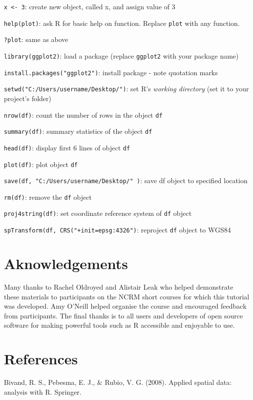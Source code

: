 \documentclass[]{article}
\begin{document}
\texttt{x \textless{}- 3}: create new object, called x, and assign value
of 3

\texttt{help(plot)}: ask R for basic help on function. Replace
\texttt{plot} with any function.

\texttt{?plot}: same as above

\texttt{library(ggplot2)}: load a package (replace \texttt{ggplot2} with
your package name)

\texttt{install.packages("ggplot2")}: install package - note quotation
marks

\texttt{setwd("C:/Users/username/Desktop/")}: set R's \emph{working
directory} (set it to your project's folder)

\texttt{nrow(df)}: count the number of rows in the object \texttt{df}

\texttt{summary(df)}: summary statistics of the object \texttt{df}

\texttt{head(df)}: display first 6 lines of object \texttt{df}

\texttt{plot(df)}: plot object \texttt{df}

\texttt{save(df, "C:/Users/username/Desktop/" )}: save df object to
specified location

\texttt{rm(df)}: remove the \texttt{df} object

\texttt{proj4string(df)}: set coordinate reference system of \texttt{df}
object

\texttt{spTransform(df, CRS("+init=epsg:4326")}: reproject \texttt{df}
object to WGS84

\section{Aknowledgements}\label{aknowledgements}

Many thanks to Rachel Oldroyed and Alistair Leak who helped demonstrate
these materials to participants on the NCRM short courses for which this
tutorial was developed. Amy O'Neill helped organise the course and
encouraged feedback from participants. The final thanks is to all users
and developers of open source software for making powerful tools such as
R accessible and enjoyable to use.

\newpage \section{References}\label{references}

Bivand, R. S., Pebesma, E. J., \& Rubio, V. G. (2008). Applied spatial
data: analysis with R. Springer.
\end{document}
